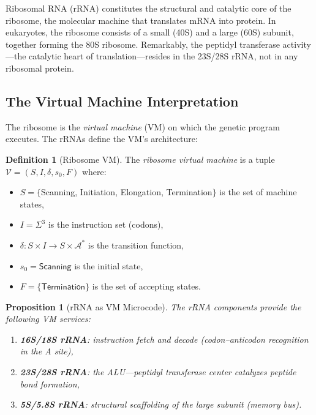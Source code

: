\documentclass[12pt,a4paper]{article}
\newtheorem{proposition}[theorem]{Proposition}
\theoremstyle{definition}
\newtheorem{definition}[theorem]{Definition}
\begin{document}
Ribosomal RNA (rRNA) constitutes the structural and catalytic core of
the ribosome, the molecular machine that translates mRNA into protein.
In eukaryotes, the ribosome consists of a small (40S) and a large (60S)
subunit, together forming the 80S ribosome.  Remarkably, the peptidyl
transferase activity---the catalytic heart of translation---resides in
the 23S/28S rRNA, not in any ribosomal protein.

\subsection{The Virtual Machine Interpretation}

The ribosome is the \emph{virtual machine} (VM) on which the genetic
program executes.  The rRNAs define the VM's architecture:

\begin{definition}[Ribosome VM]\label{def:ribosome-vm}
The \emph{ribosome virtual machine} is a tuple
$\mathcal{V} = (S, I, \delta, s_0, F)$ where:
\begin{itemize}
  \item $S = \{$\textsf{Scanning}, \textsf{Initiation},
    \textsf{Elongation}, \textsf{Termination}$\}$ is the set of
    machine states,
  \item $I = \Sigma^3$ is the instruction set (codons),
  \item $\delta : S \times I \to S \times \mathcal{A}^*$ is the
    transition function,
  \item $s_0 = \textsf{Scanning}$ is the initial state,
  \item $F = \{\textsf{Termination}\}$ is the set of accepting states.
\end{itemize}
\end{definition}

\begin{proposition}[rRNA as VM Microcode]
The rRNA components provide the following VM services:
\begin{enumerate}[label=(\roman*)]
  \item \textbf{16S/18S rRNA}: instruction fetch and decode
    (codon--anticodon recognition in the A site),
  \item \textbf{23S/28S rRNA}: the ALU---peptidyl transferase center
    catalyzes peptide bond formation,
  \item \textbf{5S/5.8S rRNA}: structural scaffolding of the large subunit
    (memory bus).
\end{enumerate}
\end{proposition}
\end{document}
